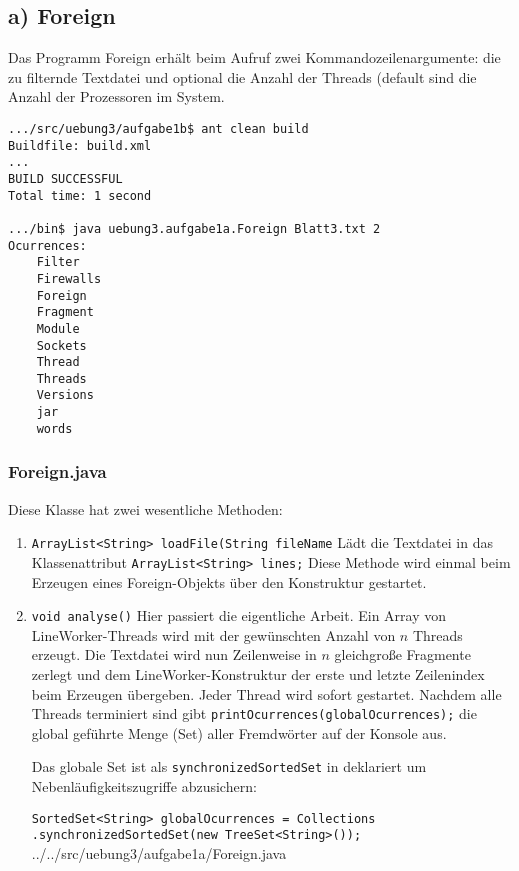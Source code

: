 \subsection*{a) Foreign}

Das Programm Foreign erhält beim Aufruf zwei Kommandozeilenargumente: die zu filternde Textdatei und optional die Anzahl der Threads (default sind die Anzahl der Prozessoren im System.

\begin{verbatim}
.../src/uebung3/aufgabe1b$ ant clean build
Buildfile: build.xml
...
BUILD SUCCESSFUL
Total time: 1 second

.../bin$ java uebung3.aufgabe1a.Foreign Blatt3.txt 2
Ocurrences:
	Filter
	Firewalls
	Foreign
	Fragment
	Module
	Sockets
	Thread
	Threads
	Versions
	jar
	words
\end{verbatim}

\subsubsection*{Foreign.java}

Diese Klasse hat zwei wesentliche Methoden:
\begin{enumerate}

\item \texttt{ArrayList<String> loadFile(String fileName}
Lädt die Textdatei in das Klassenattribut \texttt{ArrayList<String> lines;}
Diese Methode wird einmal beim Erzeugen eines Foreign-Objekts über den Konstruktur gestartet.

\item \texttt{void analyse()}
Hier passiert die eigentliche Arbeit. Ein Array von LineWorker-Threads wird mit der gewünschten Anzahl von $n$ Threads erzeugt. Die Textdatei wird nun Zeilenweise in $n$ gleichgroße Fragmente zerlegt und dem LineWorker-Konstruktur der erste und letzte Zeilenindex beim Erzeugen übergeben. Jeder Thread wird sofort gestartet. Nachdem alle Threads terminiert sind gibt \texttt{printOcurrences(globalOcurrences);} die global geführte Menge (Set) aller Fremdwörter auf der Konsole aus.

Das globale Set ist als \texttt{synchronizedSortedSet} in deklariert um Nebenläufigkeitszugriffe abzusichern:

\texttt{SortedSet<String> globalOcurrences = Collections
			.synchronizedSortedSet(new TreeSet<String>());}
\\


{../../src/uebung3/aufgabe1a/Foreign.java}

\end{enumerate}


